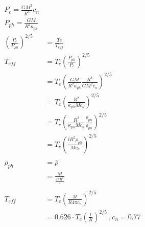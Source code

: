 \documentclass[10pt,a4paper]{article}
\begin{document}
\begin{align*}
P_c = \frac{GM^2}{R^4}c_n\\
P_{ph} = \frac{GM}{R^2 \kappa_{ph}}\\
\left( \frac{P_c}{P_{ph}}\right)^{2/5} & = \frac{Tc}{T_{eff}}\\
T_{eff} & = T_c \left( \frac{P_{ph}}{P_c} \right)^{2/5}\\
& = T_c \left( \frac{GM}{R^2 \kappa_{ph}} \frac{R^4}{GM^2 c_n} \right)^{2/5}\\
& = T_c \left( \frac{R^2}{\kappa_{ph}M c_n} \right)^{2/5}\\
& = T_c \left( \frac{R^2}{\kappa_{ph}M c_n} \frac{\rho_{ph}}{\rho_{ph}}\right)^{2/5}\\
& = T_c \left( \frac{lR^2 \rho_{ph}}{M c_n}  \right)^{2/5}\\
\\
\rho_{ph} & = \bar{\rho}\\
& = \frac{M}{\frac{4 \pi R^3}{3}}\\
\\
T_{eff} & =T_c \left( \frac{3l}{R 4 \pi c_n} \right)^{2/5}\\
& =0.626  \cdot T_c\left(\frac{l}{R} \right) ^{2/5}~, c_n = \text{0.77}
\end{align*}
\end{document}
